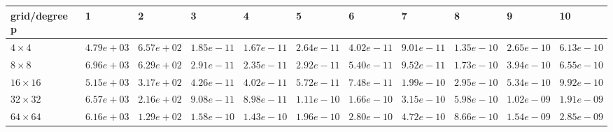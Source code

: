 \begin{tabular}{lllllllllll}
\hline
 grid/degree p   & 1          & 2          & 3          & 4          & 5          & 6          & 7          & 8          & 9          & 10         \\
\hline
 $4 \times 4$    & $4.79e+03$ & $6.57e+02$ & $1.85e-11$ & $1.67e-11$ & $2.64e-11$ & $4.02e-11$ & $9.01e-11$ & $1.35e-10$ & $2.65e-10$ & $6.13e-10$ \\
 $8 \times 8$    & $6.96e+03$ & $6.29e+02$ & $2.91e-11$ & $2.35e-11$ & $2.92e-11$ & $5.40e-11$ & $9.52e-11$ & $1.73e-10$ & $3.94e-10$ & $6.55e-10$ \\
 $16 \times 16$  & $5.15e+03$ & $3.17e+02$ & $4.26e-11$ & $4.02e-11$ & $5.72e-11$ & $7.48e-11$ & $1.99e-10$ & $2.95e-10$ & $5.34e-10$ & $9.92e-10$ \\
 $32 \times 32$  & $6.57e+03$ & $2.16e+02$ & $9.08e-11$ & $8.98e-11$ & $1.11e-10$ & $1.66e-10$ & $3.15e-10$ & $5.98e-10$ & $1.02e-09$ & $1.91e-09$ \\
 $64 \times 64$  & $6.16e+03$ & $1.29e+02$ & $1.58e-10$ & $1.43e-10$ & $1.96e-10$ & $2.80e-10$ & $4.72e-10$ & $8.66e-10$ & $1.54e-09$ & $2.85e-09$ \\
\hline
\end{tabular}
